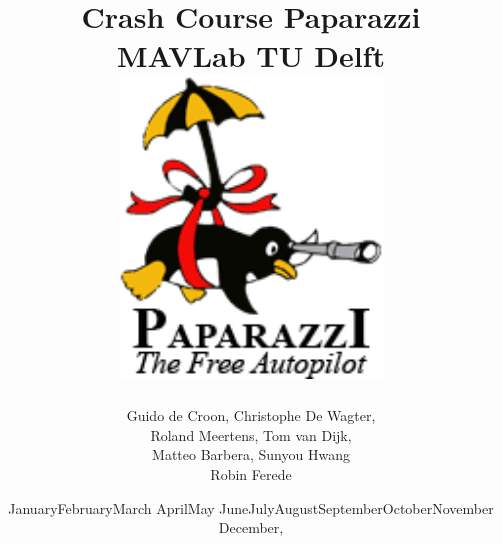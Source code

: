 \documentclass{report}
\newcommand{\todaytext}{\ifcase \month \or January\or February\or March\or %
April\or May \or June\or July\or August\or September\or October\or November\or %
December\fi, \number \year}
\begin{document}
\author{Guido de Croon, Christophe De Wagter, \\Roland Meertens, Tom van Dijk, \\Matteo Barbera, Sunyou Hwang \\Robin Ferede}
\title{\bf Crash Course Paparazzi \the\year\\MAVLab TU Delft\\\vspace{1cm}\includegraphics[width=7cm]{docs/paparazziimage.png}}
\date{\todaytext}
\maketitle



\tableofcontents

\setlength{\parindent}{0em}





	
\appendix


\end{document}

